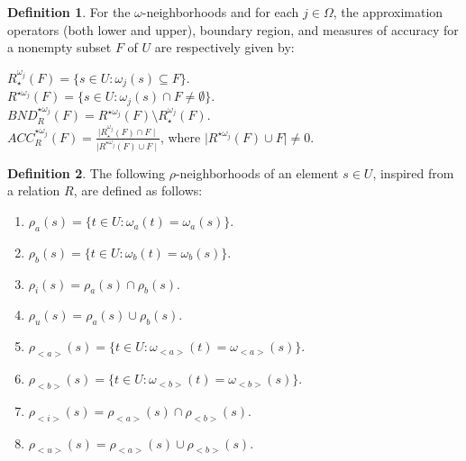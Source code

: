 \documentclass{article}
\theoremstyle{theorem}
\theoremstyle{definition}
\newtheorem{definition}{Definition}[section]
\theoremstyle{remark}
\begin{document}
\begin{definition} \label{d5}  \cite{Yao 1998, Allam2005,Kozae 2010} For the $\omega$-neighborhoods and for each $j \in \Omega$, the approximation operators (both lower and upper), boundary region, and measures of accuracy for a nonempty subset $F$ of $U$ are respectively given by:

\begin{center}
$R_{\star}^{\omega_j}(F) = \{s \in U : \omega_{j}(s) \subseteq F\}$.\\
$R^{\star\omega_j}(F) = \{s \in U : \omega_{j}(s) \cap F \neq\emptyset\}$.\\
$BND_{R}^{\star\omega_j}(F) = R^{\star\omega_j}(F) \setminus R_{\star}^{\omega_j}(F)$.\\
$ACC_{R}^{\star\omega_j}(F) = \frac{\mid R_{\star}^{\omega_j}(F)\cap F\mid}{\mid R^{\star\omega_j}(F)\cup F\mid}$, where $\mid R^{\star\omega_j}(F)\cup F\mid\neq0$.
\end{center}
\end{definition}
\color{black}

\begin{definition} \label{d4}  \cite{Atef 2020,El-Bably 2021, Nawar 2021,Hung 2008,Xiaole 2013,Mareay 2016} The following $\rho$-neighborhoods of an element $s \in U$, inspired from a relation $R$, are defined as follows:
\begin{enumerate}
\item  $\rho_{a}(s) = \{t \in U : \omega_{a}(t) = \omega_{a}(s)\}$.
\item  $\rho_{b}(s) = \{t \in U : \omega_{b}(t) = \omega_{b}(s)\}$.
\item  $\rho_{i}(s) = \rho_{a}(s) \cap \rho_{b}(s)$.
\item  $\rho_{u}(s) = \rho_{a}(s) \cup \rho_{b}(s)$.
\item  $\rho_{<a>}(s) = \{t \in U : \omega_{<a>}(t) = \omega_{<a>}(s)\}$.
\item  $\rho_{<b>}(s) = \{t \in U : \omega_{<b>}(t) = \omega_{<b>}(s)\}$.
\item  $\rho_{<i>}(s) = \rho_{<a>}(s) \cap \rho_{<b>}(s)$.
\item  $\rho_{<u>}(s) = \rho_{<a>}(s) \cup \rho_{<b>}(s)$.
\end{enumerate}
\end{definition}
\end{document}

